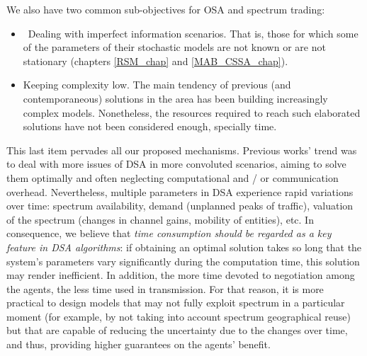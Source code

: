 We also have two common sub-objectives for OSA and spectrum trading:
\begin{itemize}
\item Dealing with imperfect information scenarios. That is, those for which some of the parameters of their stochastic models are not known or are not stationary (chapters \ref{RSM_chap} and \ref{MAB_CSSA_chap}). 
\item Keeping complexity low. The main tendency of previous (and contemporaneous) solutions in the area has been building increasingly complex models. Nonetheless, the resources required to reach such elaborated solutions have not been considered enough, specially time.
\end{itemize}
This last item pervades all our proposed mechanisms.
Previous works' trend was to deal with more  issues of DSA in more convoluted scenarios, aiming to solve them optimally and often neglecting computational and / or communication overhead.
Nevertheless, multiple parameters in DSA experience rapid variations over time: spectrum availability, demand (unplanned peaks of traffic), valuation of the spectrum (changes in channel gains, mobility of entities), etc.
In consequence, we believe that \emph{time consumption should be regarded as a key feature in DSA algorithms}: if obtaining an optimal solution takes so long that the system’s parameters vary significantly during the computation time, this solution may render inefficient. 
In addition, the more time devoted to negotiation among the agents, the less time used in transmission. 
For that reason, it is more practical to design models that may not fully exploit spectrum in a particular moment (for example, by not taking into account spectrum geographical reuse) but that are capable of reducing the uncertainty due to the changes over time, and thus, providing higher guarantees on the agents’ benefit. 



